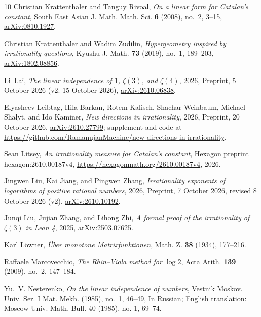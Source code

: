 \documentclass[11pt]{amsart}
\theoremstyle{definition}
\theoremstyle{remark}
\numberwithin{equation}{section}
\begin{document}
\begin{thebibliography}{10}
Christian Krattenthaler and Tanguy Rivoal, \emph{On a linear form for
  {C}atalan's constant}, South East Asian J. Math. Math. Sci. \textbf{6}
  (2008), no.~2, 3--15,
  \href{https://arxiv.org/abs/0810.1927}{arXiv:0810.1927}.

Christian Krattenthaler and Wadim Zudilin, \emph{Hypergeometry inspired by
  irrationality questions}, Kyushu J. Math. \textbf{73} (2019), no.~1,
  189--203, \href{https://arxiv.org/abs/1802.08856}{arXiv:1802.08856}.

Li~Lai, \emph{The linear independence of {$1$}, {$\zeta(3)$}, and
  {$\zeta(4)$}}, 2026, Preprint, 5 October 2026 (v2: 15 October 2026),
  \href{https://arxiv.org/abs/2610.06838}{arXiv:2610.06838}.

Elyasheev Leibtag, Hila Barkan, Rotem Kalisch, Shachar Weinbaum, Michael
  Shalyt, and Ido Kaminer, \emph{New directions in irrationality}, 2026,
  Preprint, 20 October 2026,
  \href{https://arxiv.org/abs/2610.27799}{arXiv:2610.27799}; supplement and
  code at
  \url{https://github.com/RamanujanMachine/new-directions-in-irrationality}.

Sean Litsey, \emph{An irrationality measure for {C}atalan's constant}, Hexagon
  preprint hexagon:2610.00187v4, \url{https://hexagonmath.org/2610.00187v4},
  2026.

Jingwen Liu, Kai Jiang, and Pingwen Zhang, \emph{Irrationality exponents of
  logarithms of positive rational numbers}, 2026, Preprint, 7 October 2026,
  revised 8 October 2026 (v2),
  \href{https://arxiv.org/abs/2610.10192}{arXiv:2610.10192}.

Junqi Liu, Jujian Zhang, and Lihong Zhi, \emph{A formal proof of the
  irrationality of {$\zeta(3)$} in {L}ean 4}, 2025,
  \href{https://arxiv.org/abs/2503.07625}{arXiv:2503.07625}.

Karl L\"owner, \emph{\"{U}ber monotone {M}atrixfunktionen}, Math. Z.
  \textbf{38} (1934), 177--216.

Raffaele Marcovecchio, \emph{The {R}hin--{V}iola method for {$\log 2$}}, Acta
  Arith. \textbf{139} (2009), no.~2, 147--184.

Yu.~V. Nesterenko, \emph{On the linear independence of numbers}, Vestnik
  Moskov. Univ. Ser. I Mat. Mekh. (1985), no.~1, 46--49, In Russian; English
  translation: Moscow Univ. Math. Bull. 40 (1985), no. 1, 69--74.


\end{thebibliography}
\end{document}
